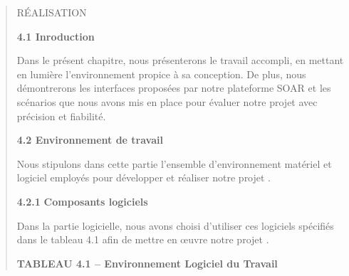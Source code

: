 \documentclass[
]{article}
\begin{document}
\begin{quote}
RÉALISATION

\textbf{4.1 Inroduction}

Dans le présent chapitre, nous présenterons le travail accompli, en
mettant en lumière l'environnement propice à sa conception. De plus,
nous démontrerons les interfaces proposées par notre plateforme SOAR et
les scénarios que nous avons mis en place pour évaluer notre projet avec
précision et fiabilité.

\textbf{4.2 Environnement de travail}

Nous stipulons dans cette partie l'ensemble d'environnement matériel et
logiciel employés pour développer et réaliser notre projet .

\textbf{4.2.1} \textbf{Composants logiciels}

Dans la partie logicielle, nous avons choisi d'utiliser ces logiciels
spécifiés dans le tableau 4.1 afin de mettre en œuvre notre projet .

\textbf{TABLEAU 4.1 -- Environnement Logiciel du Travail}
\end{quote}
\end{document}
